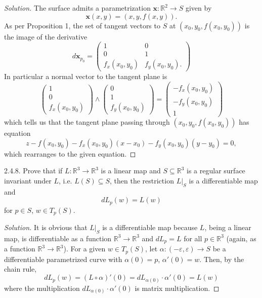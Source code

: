 \documentclass[10pt]{scrartcl}
\providecommand{\eps}{\varepsilon}
\providecommand{\RR}{\mathbb R}
\providecommand{\mb}[1]{\mathbf{#1}}
\newenvironment{soln}{\begin{proof}[Solution]}{\end{proof}}
\begin{document}
\begin{soln}
	The surface admits a parametrization $\mb x\colon\RR^2\to S$ given by
	\[\mb x(x, y) = (x, y, f(x,y)).\]
	As per Proposition 1, the set of tangent vectors to $S$ at
	$(x_0,y_0,f(x_0,y_0))$
	is the image of the derivative
	\[d\mb x_{p_0} = \begin{pmatrix}
		1&0\\
		0&1\\
		f_x(x_0,y_0)&f_y(x_0,y_0).
	\end{pmatrix}\]
	In particular a normal vector to the tangent plane is
	\[\begin{pmatrix}
		1\\0\\f_x(x_0,y_0)
	\end{pmatrix}\wedge\begin{pmatrix}
		0\\1\\f_y(x_0,y_0)
	\end{pmatrix} =\begin{pmatrix}
		-f_x(x_0,y_0)\\-f_y(x_0,y_0)\\1
	\end{pmatrix}\]
	which tells us that the tangent plane passing through
	$(x_0,y_0,f(x_0,y_0))$ has equation
	\[z-f(x_0,y_0) - f_x(x_0,y_0)(x-x_0) - f_y(x_0,y_0)(y - y_0) = 0,\]
	which rearranges to the given equation.
\end{soln}

\begin{problem*}2.4.8.
	Prove that if $L\colon\RR^3\to\RR^3$ is a linear map and $S\subseteq\RR^3$
	is a regular surface invariant under $L$, i.e. $L(S)\subseteq S$,
	then the restriction $L|_S$ is a differentiable map and
	\[dL_p(w) = L(w)\]
	for $p\in S$, $w\in T_p(S)$.
\end{problem*}

\begin{soln}
	It is obvious that $L|_S$ is a differentiable map
	because $L$, being a linear map, is differentiable
	as a function $\RR^3\to\RR^3$ and $dL_p = L$ for all $p\in\RR^3$
	(again, as a function $\RR^3\to\RR^3$).
	For a given $w\in T_p(S)$, let $\alpha\colon(-\eps,\eps)\to S$
	be a differentiable parametrized curve with $\alpha(0) = p$,
	$\alpha'(0) = w$. Then, by the chain rule,
	\[dL_p(w) = (L\circ\alpha)'(0) = dL_{\alpha(0)}\cdot \alpha'(0)
	= L(w)\]
	where the multiplication $dL_{\alpha(0)}\cdot\alpha'(0)$
	is matrix multiplication.
\end{soln}
\end{document}
